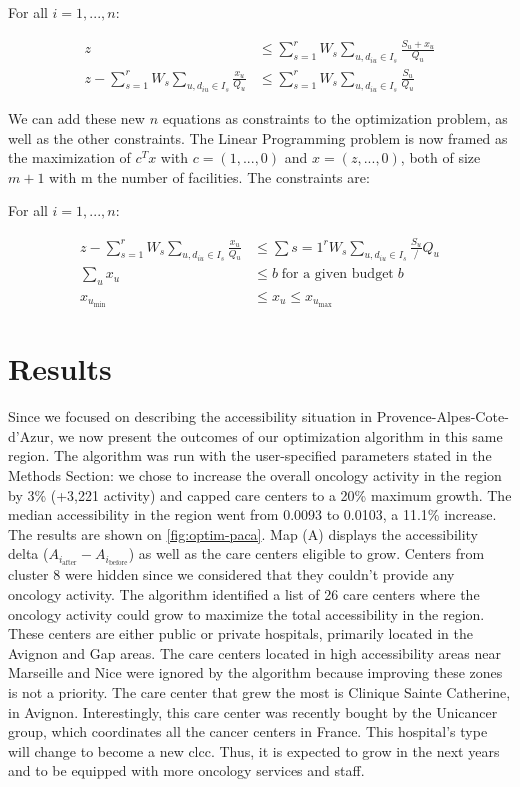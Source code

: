 For all $i=1, ... ,n$:

\begin{align*}
z &\leq \sum_{s=1}^{r} W_s \sum_{u, d_{iu} \in I_s} \frac{S_u + x_u}{Q_u} \\
z - \sum_{s=1}^{r} W_s \sum_{u,d_{iu} \in I_s} \frac{x_u}{Q_u} &\leq \sum_{s=1}^{r} W_s \sum_{u,d_{iu} \in I_s} \frac{S_u}{Q_u}
\end{align*}

We can add these new $n$ equations as constraints to the optimization problem, as well as the other constraints. The Linear Programming problem is now framed as the maximization of $c^T x$ with $c=(1, ... ,0)$ and $x=(z, ... ,0)$, both of size $m+1$ with m the number of facilities. The constraints are:

For all $i=1, ... ,n$:

\begin{align*}
z - \sum_{s=1}^{r} W_s \sum_{u,d_{iu} \in I_s} \frac{x_u}{Q_u} &\leq \sum{s=1}^{r} W_s \sum_{u,d_{iu} \in I_s} \frac{S_u}/{Q_u} \\
\sum_{u} x_u &\leq b \; \text{for a given budget} \; b \\
x_{u_\text{min}} &\leq x_u \leq x_{u_\text{max}}
\end{align*}

\section{Results}

Since we focused on describing the accessibility situation in Provence-Alpes-Cote-d'Azur, we now present the outcomes of our optimization algorithm in this same region. The algorithm was run with the user-specified parameters stated in the Methods Section: we chose to increase the overall oncology activity in the region by 3\% (+3,221 activity) and capped care centers to a 20\% maximum growth. The median accessibility in the region went from 0.0093 to 0.0103, a 11.1\% increase. The results are shown on \cref{fig:optim-paca}. Map (A) displays the accessibility delta ($A_{i_\text{after}} - A_{i_\text{before}}$) as well as the care centers eligible to grow. Centers from cluster 8 were hidden since we considered that they couldn't provide any oncology activity. The algorithm identified a list of 26 care centers where the oncology activity could grow to maximize the total accessibility in the region. These centers are either public or private hospitals, primarily located in the Avignon and Gap areas. The care centers located in high accessibility areas near Marseille and Nice were ignored by the algorithm because improving these zones is not a priority. The care center that grew the most is Clinique Sainte Catherine, in Avignon. Interestingly, this care center was recently bought by the Unicancer group, which coordinates all the cancer centers in France. This hospital's type will change to become a new \ac{clcc}. Thus, it is expected to grow in the next years and to be equipped with more oncology services and staff.

